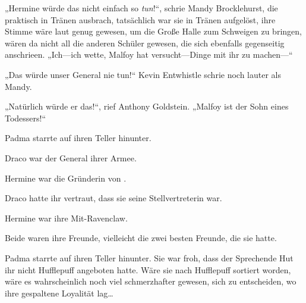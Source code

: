 „Hermine würde das nicht einfach so \emph{tun}!“, schrie Mandy Brocklehurst, die praktisch in Tränen ausbrach, tatsächlich war sie in Tränen aufgelöst, ihre Stimme wäre laut genug gewesen, um die Große Halle zum Schweigen zu bringen, wären da nicht all die anderen Schüler gewesen, die sich ebenfalls gegenseitig anschrieen. „Ich—ich wette, Malfoy hat versucht—Dinge mit ihr zu machen—“

„Das würde unser General nie tun!“ Kevin Entwhistle schrie noch lauter als Mandy.

„Natürlich würde er das!“, rief Anthony Goldstein. „Malfoy ist der Sohn eines Todessers!“






Padma starrte auf ihren Teller hinunter.

Draco war der General ihrer Armee.

Hermine war die Gründerin von \SPHEW.

Draco hatte ihr vertraut, dass sie seine Stellvertreterin war.

Hermine war ihre Mit-Ravenclaw.

Beide waren ihre Freunde, vielleicht die zwei besten Freunde, die sie hatte.

Padma starrte auf ihren Teller hinunter. Sie war froh, dass der Sprechende Hut ihr nicht Hufflepuff angeboten hatte. Wäre sie nach Hufflepuff sortiert worden, wäre es wahrscheinlich noch viel schmerzhafter gewesen, sich zu entscheiden, wo ihre gespaltene Loyalität lag…

